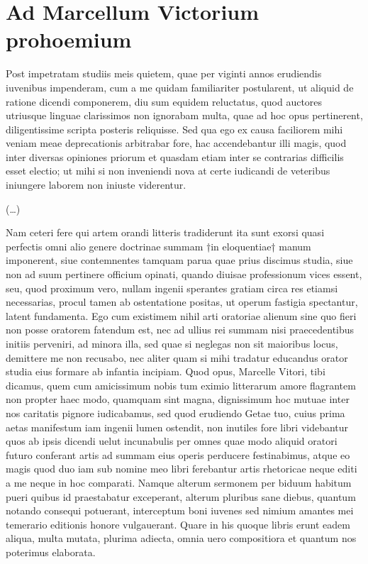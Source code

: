 \section*{Ad Marcellum Victorium prohoemium}

Post impetratam studiis meis quietem, quae per viginti annos erudiendis iuvenibus impenderam, cum a me quidam familiariter postularent, ut aliquid de ratione dicendi componerem, diu sum equidem reluctatus, quod auctores utriusque linguae clarissimos non ignorabam multa, quae ad hoc opus pertinerent, diligentissime scripta posteris reliquisse. Sed qua ego ex causa faciliorem mihi veniam meae deprecationis arbitrabar fore, hac accendebantur illi magis, quod inter diversas opiniones priorum et quasdam etiam inter se contrarias difficilis esset electio; ut mihi si non inveniendi nova at certe iudicandi de veteribus iniungere laborem non iniuste viderentur.

(\dots)

Nam ceteri fere qui artem orandi litteris tradiderunt ita sunt exorsi quasi perfectis omni alio genere doctrinae summam †in eloquentiae† manum imponerent, siue contemnentes tamquam parua quae prius discimus studia, siue non ad suum pertinere officium opinati, quando diuisae professionum vices essent, seu, quod proximum vero, nullam ingenii sperantes gratiam circa res etiamsi necessarias, procul tamen ab ostentatione positas, ut operum fastigia spectantur, latent fundamenta. Ego cum existimem nihil arti oratoriae alienum sine quo fieri non posse oratorem fatendum est, nec ad ullius rei summam nisi praecedentibus initiis perveniri, ad minora illa, sed quae si neglegas non sit maioribus locus, demittere me non recusabo, nec aliter quam si mihi tradatur educandus orator studia eius formare ab infantia incipiam. Quod opus, Marcelle Vitori, tibi dicamus, quem cum amicissimum nobis tum eximio litterarum amore flagrantem non propter haec modo, quamquam sint magna, dignissimum hoc mutuae inter nos caritatis pignore iudicabamus, sed quod erudiendo Getae tuo, cuius prima aetas manifestum iam ingenii lumen ostendit, non inutiles fore libri videbantur quos ab ipsis dicendi uelut incunabulis per omnes quae modo aliquid oratori futuro conferant artis ad summam eius operis perducere festinabimus, atque eo magis quod duo iam sub nomine meo libri ferebantur artis rhetoricae neque editi a me neque in hoc comparati. Namque alterum sermonem per biduum habitum pueri quibus id praestabatur exceperant, alterum pluribus sane diebus, quantum notando consequi potuerant, interceptum boni iuvenes sed nimium amantes mei temerario editionis honore vulgauerant. Quare in his quoque libris erunt eadem aliqua, multa mutata, plurima adiecta, omnia uero compositiora et quantum nos poterimus elaborata.

